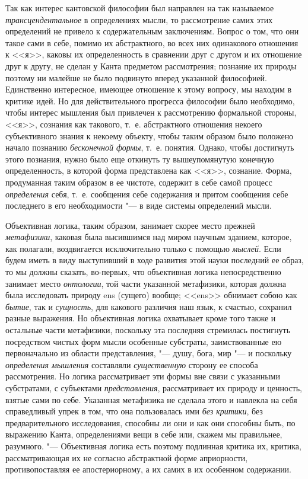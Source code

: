 Так как интерес кантовской философии был направлен на так называемое
{\em трансцендентальное} в определениях мысли, то
рассмотрение самих этих определений не привело к содержательным
заключениям. Вопрос о том, что они такое сами в себе, помимо их
абстрактного, во всех них одинакового отношения к <<я>>, каковы их
определенность в сравнении друг с другом и их отношение друг к другу, не
сделан у Канта предметом рассмотрения; познание их природы поэтому ни
малейше не было подвинуто вперед указанной философией. Единственно
интересное, имеющее отношение к этому вопросу, мы находим в критике идей.
Но для действительного прогресса философии было необходимо, чтобы интерес
мышления был привлечен к рассмотрению формальной стороны, <<я>>, сознания как
такового, т.~е. абстрактного отношения некоего субъективного знания к
некоему объекту, чтобы таким образом было положено начало познанию
{\em бесконечной формы}, т.~е. понятия. Однако, чтобы
достигнуть этого познания, нужно было еще откинуть ту вышеупомянутую
конечную определенность, в которой форма представлена как <<я>>, сознание.
Форма, продуманная таким образом в ее чистоте, содержит в себе самой
процесс {\em определения} себя, т.~е. сообщения себе
содержания и притом сообщения себе последнего в его необходимости "--- в виде
системы определений мысли.

Объективная логика, таким образом, занимает скорее место прежней
{\em метафизики}, каковая была высившимся над миром
научным зданием, которое, как полагали, воздвигается исключительно только с
помощью {\em мыслей}. Если будем иметь в виду
выступивший в ходе развития этой науки последний ее
образ,
то мы должны сказать, во-первых, что объективная логика непосредственно
занимает место {\em онтологии}, той части указанной
метафизики, которая должна была исследовать природу ens (сущего) вообще;
<<ens>> обнимает собою как {\em бытие}, так и
{\em сущность}, для какового различия наш язык, к
счастью, сохранил разные выражения. Но объективная логика охватывает кроме
того также и остальные части метафизики, поскольку эта последняя стремилась
постигнуть посредством чистых форм мысли особенные субстраты,
заимствованные ею первоначально из области представления, "--- душу, бога,
мир "--- и поскольку {\em определения мышления} составляли
{\em существенную} сторону ее способа рассмотрения. Но
логика рассматривает эти формы вне связи с указанными субстратами, с
субъектами {\em представления}, рассматривает их
природу и ценность, взятые сами по себе. Указанная метафизика не сделала
этого и навлекла на себя справедливый упрек в том, что она пользовалась ими
{\em без критики}, без предварительного исследования,
способны ли они и как они способны быть, по выражению Канта, определениями
вещи в себе или, скажем мы правильнее, разумного. "--- Объективная логика есть
поэтому подлинная критика их, критика, рассматривающая их не согласно
абстрактной форме априорности, противопоставляя ее апостериорному, а их
самих в их особенном содержании.

